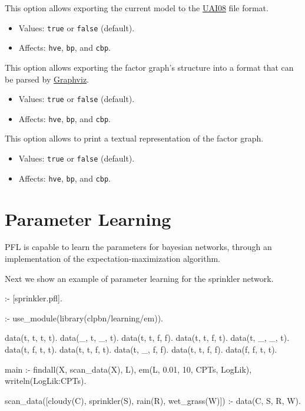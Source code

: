 \documentclass{article}
\begin{document}
This option allows exporting the current model to the \href{http://graphmod.ics.uci.edu/uai08/FileFormat}{UAI08} file format.
\begin{itemize}
  \item Values: \texttt{true} or \texttt{false} (default).
  \item Affects: \texttt{hve}, \texttt{bp}, and \texttt{cbp}.
\end{itemize}


This option allows exporting the factor graph's structure into a format that can be parsed by \href{http://www.graphviz.org/}{Graphviz}.
\begin{itemize}
  \item Values: \texttt{true} or \texttt{false} (default).
  \item Affects: \texttt{hve}, \texttt{bp}, and \texttt{cbp}.
\end{itemize}

This option allows to print a textual representation of the factor graph.
\begin{itemize}
  \item Values: \texttt{true} or \texttt{false} (default).
  \item Affects: \texttt{hve}, \texttt{bp}, and \texttt{cbp}.
\end{itemize}



\section{Parameter Learning}
PFL is capable to learn the parameters for bayesian networks, through an implementation of the expectation-maximization algorithm.

Next we show an example of parameter learning for the sprinkler network.

\begin{pflcode}
:- [sprinkler.pfl].

:- use_module(library(clpbn/learning/em)).

data(t, t, t, t).
data(_, t, _, t).
data(t, t, f, f).
data(t, t, f, t).
data(t, _, _, t).
data(t, f, t, t).
data(t, t, f, t).
data(t, _, f, f).
data(t, t, f, f).
data(f, f, t, t).

main :-
    findall(X, scan_data(X), L),
    em(L, 0.01, 10, CPTs, LogLik),
    writeln(LogLik:CPTs).

scan_data([cloudy(C), sprinkler(S), rain(R), wet_grass(W)]) :-
    data(C, S, R, W).
\end{pflcode}
\end{document}
